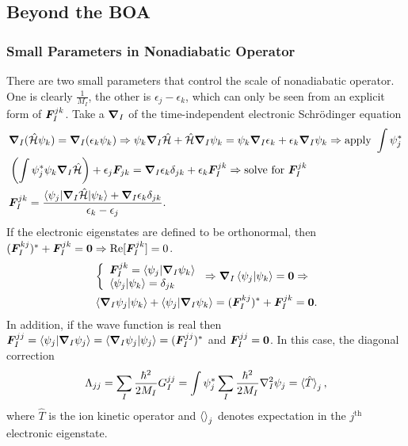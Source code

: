 \subsection{Beyond the BOA}

\subsubsection{Small Parameters in Nonadiabatic Operator}
There are two small parameters that control the scale of nonadiabatic operator. One is clearly $\frac{1}{M_I}$, the other is $\epsilon_j-\epsilon_k$, which can only be seen from an explicit form of $\boldsymbol{F}_I^{jk}$. Take a $\boldsymbol{\nabla}_I$ of the time-independent electronic Schr\"odinger equation
\begin{align}
&\boldsymbol{\nabla}_I(\hat{\mathcal{H}}\psi_k) = \boldsymbol{\nabla}_I(\epsilon_k\psi_k ) \Rightarrow \psi_k\boldsymbol{\nabla}_I\hat{\mathcal{H}} + \hat{\mathcal{H}}\boldsymbol{\nabla}_I\psi_k = \psi_k\boldsymbol{\nabla}_I\epsilon_k + \epsilon_k\boldsymbol{\nabla}_I\psi_k \Rightarrow \nonumber \text{apply }\int\psi_j^* \\ &\left(\int \psi_j^*\psi_k\boldsymbol{\nabla}_I\hat{\mathcal{H}}\right) + \epsilon_j \boldsymbol{F}_{jk} = \boldsymbol{\nabla}_I\epsilon_k \delta_{jk}+\epsilon_k\boldsymbol{F}_I^{jk} \Rightarrow \nonumber \text{solve for }\boldsymbol{F}_I^{jk} \\
&\boldsymbol{F}_I^{jk} = \dfrac{\braket{\psi_j|\boldsymbol{\nabla}_I\hat{\mathcal{H}}|\psi_k}+\boldsymbol{\nabla}_I\epsilon_k\delta_{jk}}{\epsilon_k-\epsilon_j}.
\end{align}
If the electronic eigenstates are defined to be orthonormal, then $(\boldsymbol{F}_I^{kj})^*+\boldsymbol{F}_I^{jk}=\boldsymbol{0} \Rightarrow \text{Re}[\boldsymbol{F}_I^{jk}]=0$. 
\begin{align}
&\left\{\begin{array}{l}
\boldsymbol{F}^{jk}_I = \braket{\psi_j|\boldsymbol{\nabla}_I\psi_k} \\
\braket{\psi_j|\psi_k} = \delta_{jk}
\end{array}\right. \Rightarrow \boldsymbol{\nabla}_I \braket{\psi_j|\psi_k} = \boldsymbol{0} \nonumber \Rightarrow \\
& \braket{\boldsymbol{\nabla}_I\psi_j|\psi_k} + \braket{\psi_j|\boldsymbol{\nabla}_I\psi_k}   = (\boldsymbol{F}_I^{kj})^*+\boldsymbol{F}_I^{jk} = \boldsymbol{0}.
\end{align}
In addition, if the wave function is real then $\boldsymbol{F}_I^{jj}=\braket{\psi_j|\boldsymbol{\nabla}_I\psi_j} = \braket{\boldsymbol{\nabla}_I\psi_j|\psi_j} = (\boldsymbol{F}_I^{jj})^*$ and $\boldsymbol{F}_I^{jj}=\boldsymbol{0}$. In this case, the diagonal correction
\begin{align}
\Lambda_{jj} = \sum_I \frac{\hbar^2}{2M_I}G_I^{jj} = \int \psi_j^* \sum_I \frac{\hbar^2}{2M_I} \nabla^2_I\psi_j = \braket{\hat{T}}_j,
\end{align}
where $\hat{T}$ is the ion kinetic operator and $\braket{}_j$ denotes expectation in the $j^{\text{th}}$ electronic eigenstate.

